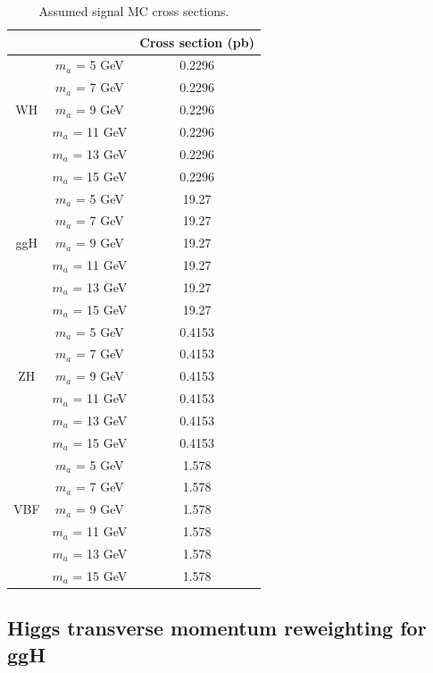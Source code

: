 \begin{table}[htbh]
\begin{center}
\caption{Assumed signal MC cross sections.\label{tab:MC-sig}}
\singlespacing
\begin{tabular}{|c|c|c|}
\hline
\multicolumn{2}{|c|}{} & Cross section (pb) \\
\hline
\multirow{5}{*}{WH} & $m_{a}$ = 5 GeV & 0.2296\\
& $m_{a}$ = 7 GeV & 0.2296\\
& $m_{a}$ = 9 GeV & 0.2296\\
& $m_{a}$ = 11 GeV & 0.2296\\
& $m_{a}$ = 13 GeV & 0.2296\\
& $m_{a}$ = 15 GeV & 0.2296\\
\hline
\multirow{5}{*}{ggH} & $m_{a}$ = 5 GeV & 19.27\\
& $m_{a}$ = 7 GeV & 19.27\\
& $m_{a}$ = 9 GeV & 19.27\\
& $m_{a}$ = 11 GeV & 19.27\\
& $m_{a}$ = 13 GeV & 19.27\\
& $m_{a}$ = 15 GeV & 19.27\\
\hline
\multirow{5}{*}{ZH} & $m_{a}$ = 5 GeV & 0.4153\\
& $m_{a}$ = 7 GeV & 0.4153\\
& $m_{a}$ = 9 GeV & 0.4153\\
& $m_{a}$ = 11 GeV & 0.4153\\
& $m_{a}$ = 13 GeV & 0.4153\\
& $m_{a}$ = 15 GeV & 0.4153\\
\hline
\multirow{5}{*}{VBF} & $m_{a}$ = 5 GeV & 1.578\\
& $m_{a}$ = 7 GeV & 1.578\\
& $m_{a}$ = 9 GeV & 1.578\\
& $m_{a}$ = 11 GeV & 1.578\\
& $m_{a}$ = 13 GeV & 1.578\\
& $m_{a}$ = 15 GeV & 1.578\\
\hline
\end{tabular}
\end{center}
\end{table}

\subsection{Higgs transverse momentum reweighting for ggH\label{sec:datasets-higgsptreweight}}


